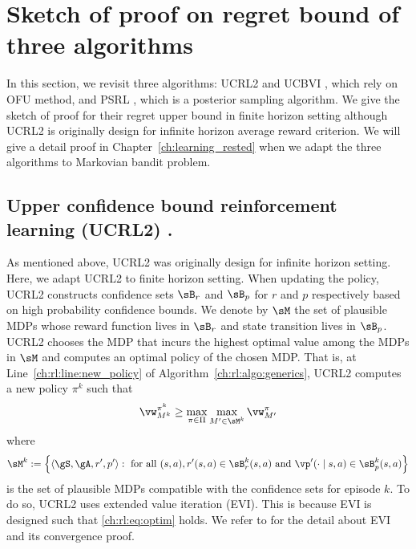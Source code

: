 \section{Sketch of proof on regret bound of three algorithms}

In this section, we revisit three algorithms: UCRL2 \cite{jaksch2010near} and UCBVI \cite{azar2017minimax}, which rely on OFU method, and PSRL \cite{osband2013more}, which is a posterior sampling algorithm.
We give the sketch of proof for their regret upper bound in finite horizon setting although UCRL2 is originally design for infinite horizon average reward criterion.
We will give a detail proof in Chapter~\ref{ch:learning_rested} when we adapt the three algorithms to Markovian bandit problem.

\subsection{Upper confidence bound reinforcement learning (UCRL2) \texorpdfstring{\cite{jaksch2010near}}{[JOA10]}.}
As mentioned above, UCRL2 was originally design for infinite horizon setting.
Here, we adapt UCRL2 to finite horizon setting.
When updating the policy, UCRL2 constructs confidence sets $\sB_r$ and $\sB_p$ for $r$ and $p$ respectively based on high probability confidence bounds.
We denote by $\sM$ the set of plausible MDPs whose reward function lives in $\sB_r$ and state transition lives in $\sB_p$.
UCRL2 chooses the MDP that incurs the highest optimal value among the MDPs in $\sM$ and computes an optimal policy of the chosen MDP.
That is, at Line~\ref{ch:rl:line:new_policy} of Algorithm~\ref{ch:rl:algo:generics}, UCRL2 computes a new policy $\pi^k$ such that
\begin{equation}
    \label{ch:rl:eq:optim}
    \vw_{M^k}^{\pi^k} \ge \max_{\pi\in\Pi}\max_{M'\in\sM^k} \vw_{M'}^\pi
\end{equation}
where
\begin{align*}
    \sM^k:=\Big\{\langle\gS,\gA,r',p'\rangle :
    \text{ for all }(s,a), r'(s,a)\in\sB_r^k(s,a) \text{ and } \vp'(\cdot\mid s,a)\in\sB_p^k(s,a)\Big\}
\end{align*}
is the set of plausible MDPs compatible with the confidence sets for episode $k$.
To do so, UCRL2 uses extended value iteration (EVI).
This is because EVI is designed such that \eqref{ch:rl:eq:optim} holds.
We refer to \cite{jaksch2010near} for the detail about EVI and its convergence proof.

